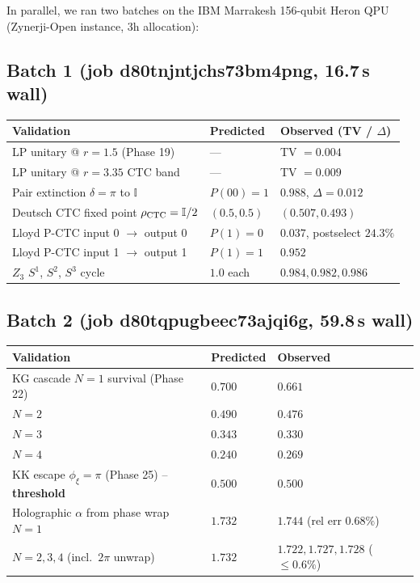 \documentclass[11pt,a4paper]{article}
\begin{document}
In parallel, we ran two batches on the IBM Marrakesh 156-qubit Heron
QPU (Zynerji-Open instance, 3h allocation):

\subsection{Batch 1 (job d80tnjntjchs73bm4png, 16.7\,s wall)}

\begin{tabular}{lll}
\toprule
Validation & Predicted & Observed (TV / $\Delta$) \\
\midrule
LP unitary @ $r=1.5$ (Phase 19) & --- & TV $=0.004$ \\
LP unitary @ $r=3.35$ CTC band  & --- & TV $=0.009$ \\
Pair extinction $\delta=\pi$ to $\mathbb{I}$ & $P(00)=1$ & $0.988$, $\Delta=0.012$ \\
Deutsch CTC fixed point $\rho_{\rm CTC}=\mathbb{I}/2$ & $(0.5,0.5)$ & $(0.507,0.493)$ \\
Lloyd P-CTC input 0 $\to$ output 0 & $P(1)=0$ & $0.037$, postselect $24.3\%$ \\
Lloyd P-CTC input 1 $\to$ output 1 & $P(1)=1$ & $0.952$ \\
$Z_3$ $S^1$, $S^2$, $S^3$ cycle      & $1.0$ each & $0.984, 0.982, 0.986$ \\
\bottomrule
\end{tabular}

\subsection{Batch 2 (job d80tqpugbeec73ajqi6g, 59.8\,s wall)}

\begin{tabular}{lll}
\toprule
Validation & Predicted & Observed \\
\midrule
KG cascade $N=1$ survival (Phase 22) & $0.700$ & $0.661$ \\
$N=2$ & $0.490$ & $0.476$ \\
$N=3$ & $0.343$ & $0.330$ \\
$N=4$ & $0.240$ & $0.269$ \\
KK escape $\phi_\xi=\pi$ (Phase 25) -- {\bf threshold} & $0.500$ & $\mathbf{0.500}$ \\
Holographic $\alpha$ from phase wrap $N=1$ & $1.732$ & $1.744$ (rel err $0.68\%$) \\
$N=2,3,4$ (incl.\ $2\pi$ unwrap) & $1.732$ & $1.722, 1.727, 1.728$ ($\le 0.6\%$) \\
\bottomrule
\end{tabular}
\end{document}
